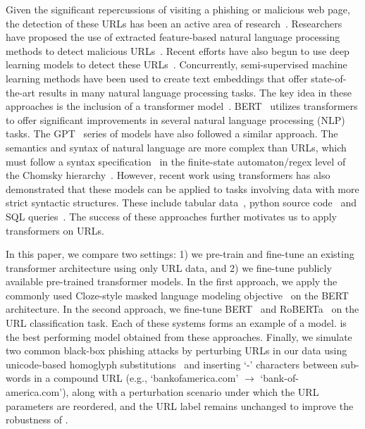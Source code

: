 Given the significant repercussions of visiting a phishing or malicious web page, the detection of these URLs has been an active area of research~\citep{sahoo2017malicious}.
Researchers have proposed the use of extracted feature-based natural language processing methods to detect malicious URLs~\citep{blum2020lexical}.
Recent efforts have also begun to use deep learning models to detect these URLs~\citep{le2018malicious,tajaddodianfar2020texception}.
Concurrently, semi-supervised machine learning methods have been used to create text embeddings that offer state-of-the-art results in many natural language processing tasks.
The key idea in these approaches is the inclusion of a transformer model~\citep{vaswani2017attention}.
BERT~\citep{devlin2019bert,rogers2020primer} utilizes transformers to offer significant
improvements in several natural language processing (NLP) tasks. 
The GPT~\citep{ratdford2018improving,ratdford2019gpt2,brown2020gpt3} series of models have also followed a similar approach.
The semantics and syntax of natural language are more complex than URLs, which must follow a syntax specification~\citep{rfc3986} in the finite-state automaton/regex level of the Chomsky hierarchy~\cite{chomsky1956three}.
However, recent work using transformers has also demonstrated that these models can be applied to tasks involving data with more strict syntactic structures.
These include tabular data~\citep{yin2020tabert}, python source code~\citep{kanade2020pre} and SQL queries~\citep{wang2020rat}.
The success of these approaches further motivates us to apply transformers on URLs.

In this paper, we compare two settings: 1) we pre-train and fine-tune an existing transformer architecture using only URL data, and 2)
we fine-tune publicly available pre-trained transformer models.
In the first approach, we apply the commonly used Cloze-style masked language modeling objective~\citep{taylor1953cloze} on  the BERT architecture. 
In the second approach, we fine-tune BERT~\citep{devlin2019bert} and RoBERTa~\citep{liu2019roberta} on the URL classification task.
Each of these systems forms an example of a \URLTranSys model.
\mbox{\URLTranSysb} is the best performing model obtained from these approaches.
Finally, we simulate two common black-box phishing attacks by perturbing URLs in our data using unicode-based homoglyph substitutions~\citep{woodbridge2018detecting} and inserting `-' characters between sub-words in a compound URL (e.g., `bankofamerica.com' $\rightarrow$ `bank-of-america.com'), along with a perturbation scenario under which the URL parameters are reordered, and the URL label remains unchanged to improve the robustness of \URLTranSys.


